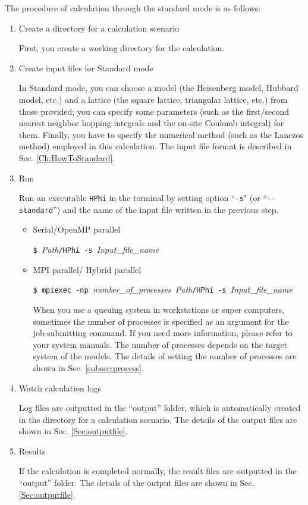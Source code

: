 The procedure of calculation through the standard mode is as follows:

\begin{enumerate}

\item Create a directory for a calculation scenario

First, you create a working directory for the calculation.

\item Create input files for Standard mode

In Standard mode, you can choose a model (the Heisenberg model, Hubbard model, etc.) and 
a lattice (the square lattice, triangular lattice, etc.) from those provided;
you can specify some parameters
(such as the first/second nearest neighbor hopping integrals and
the on-site Coulomb integral) for them.
Finally, you have to specify the numerical method (such as the Lanczos method) employed in this calculation.
The input file format is described in Sec. \ref{Ch:HowToStandard}.

\item  Run

  Run an executable \verb|HPhi| in the terminal by setting option ``\verb|-s|"
  (or ``\verb|--standard|'') and the name of the input file written in the previous step.

\begin{itemize}

\item Serial/OpenMP parallel

  \verb|$ |\textit{Path}\verb|/HPhi -s |\textit{Input\_file\_name}

\item MPI parallel/ Hybrid parallel

  \verb|$ mpiexec -np |\textit{number\_of\_processes}\verb| |\textit{Path}\verb|/HPhi -s |\textit{Input\_file\_name}

  When you use a queuing system in workstations or super computers, 
  sometimes the number of processes is specified as an argument for the job-submitting command.
  If you need more information, please refer to your system manuals. 
  The number of processes depends on the target system of the models.
  The details of setting the number of processes are shown in Sec. \ref{subsec:process}.
\end{itemize}

\item Watch calculation logs

  Log files are outputted in the ``output'' folder,
  which is automatically created in the directory for a calculation scenario.
  The details of the output files are shown in Sec. \ref{Sec:outputfile}.

\item Results

  If the calculation is completed normally,
  the result files are outputted in  the ``output'' folder.
  The details of the output files are shown in Sec. \ref{Sec:outputfile}.

\end{enumerate}

